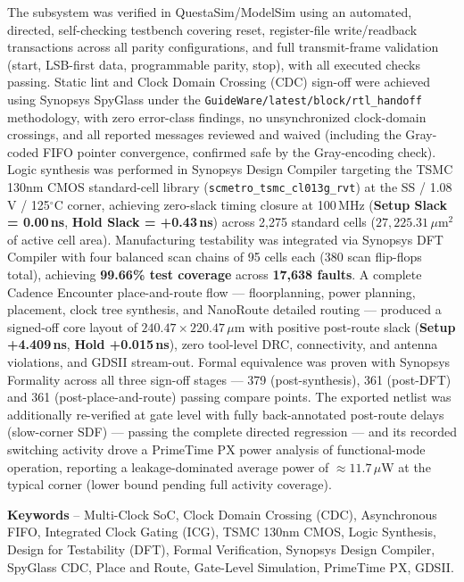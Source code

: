 \documentclass[11pt,a4paper]{article}
\begin{document}
The subsystem was verified in QuestaSim/ModelSim using an automated, directed, self-checking testbench covering reset, register-file write/readback transactions across all parity configurations, and full transmit-frame validation (start, LSB-first data, programmable parity, stop), with all executed checks passing. Static lint and Clock Domain Crossing (CDC) sign-off were achieved using Synopsys SpyGlass under the \texttt{GuideWare/latest/block/rtl\_handoff} methodology, with zero error-class findings, no unsynchronized clock-domain crossings, and all reported messages reviewed and waived (including the Gray-coded FIFO pointer convergence, confirmed safe by the Gray-encoding check). Logic synthesis was performed in Synopsys Design Compiler targeting the TSMC 130nm CMOS standard-cell library (\texttt{scmetro\_tsmc\_cl013g\_rvt}) at the SS / 1.08\,V / 125$^\circ$C corner, achieving zero-slack timing closure at 100\,MHz (\textbf{Setup Slack = 0.00\,ns}, \textbf{Hold Slack = +0.43\,ns}) across 2,275 standard cells ($27,225.31\,\mu\text{m}^2$ of active cell area). Manufacturing testability was integrated via Synopsys DFT Compiler with four balanced scan chains of 95 cells each (380 scan flip-flops total), achieving \textbf{99.66\% test coverage} across \textbf{17,638 faults}. A complete Cadence Encounter place-and-route flow --- floorplanning, power planning, placement, clock tree synthesis, and NanoRoute detailed routing --- produced a signed-off core layout of $240.47 \times 220.47\,\mu\text{m}$ with positive post-route slack (\textbf{Setup +4.409\,ns}, \textbf{Hold +0.015\,ns}), zero tool-level DRC, connectivity, and antenna violations, and GDSII stream-out. Formal equivalence was proven with Synopsys Formality across all three sign-off stages --- 379 (post-synthesis), 361 (post-DFT) and 361 (post-place-and-route) passing compare points. The exported netlist was additionally re-verified at gate level with fully back-annotated post-route delays (slow-corner SDF) --- passing the complete directed regression --- and its recorded switching activity drove a PrimeTime PX power analysis of functional-mode operation, reporting a leakage-dominated average power of $\approx 11.7\,\mu$W at the typical corner (lower bound pending full activity coverage).

\vspace{0.4cm}
\noindent
\textbf{Keywords} -- Multi-Clock SoC, Clock Domain Crossing (CDC), Asynchronous FIFO, Integrated Clock Gating (ICG), TSMC 130nm CMOS, Logic Synthesis, Design for Testability (DFT), Formal Verification, Synopsys Design Compiler, SpyGlass CDC, Place and Route, Gate-Level Simulation, PrimeTime PX, GDSII.
\end{document}
